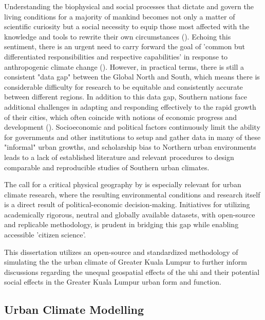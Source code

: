 Understanding the biophysical and social processes that dictate and govern the living conditions for a majority of mankind becomes not only a matter of scientific curiosity but a social necessity to equip those most affected with the knowledge and tools to rewrite their own circumstances (\cite{crit_physicalgeo}). Echoing this sentiment, there is an urgent need to carry forward the goal of 'common but differentiated responsibilities and respective capabilities' in response to anthropogenic climate change (\cite{paris_agreement}). However, in practical terms, there is still a consistent "data gap" between the Global North and South, which means there is considerable difficulty for research to be equitable and consistently accurate between different regions. In addition to this data gap, Southern nations face additional challenges in adapting and responding effectively to the rapid growth of their cities, which often coincide with notions of economic progress and development (\cite{urban_resilience}). Socioeconomic and political factors continuously limit the ability for governments and other institutions to setup and gather data in many of these "informal" urban growths, and scholarship bias to Northern urban environments leads to a lack of established literature and relevant procedures to design comparable and reproducible studies of Southern urban climates.


The call for a critical physical geography by \textcite{crit_physicalgeo} is especially relevant for urban climate research, where the resulting environmental conditions and research itself is a direct result of political-economic decision-making. Initiatives for utilizing academically rigorous, neutral and globally available datasets, with open-source and replicable methodology, is prudent in bridging this gap while enabling accessible 'citizen science'.

This dissertation utilizes an open-source and standardized methodology of simulating the the urban climate of Greater Kuala Lumpur to further inform discussions regarding the unequal geospatial effects of the \Gls{uhi} and their potential social effects in the Greater Kuala Lumpur urban form and function. 



 



\subsection{Urban Climate Modelling}

